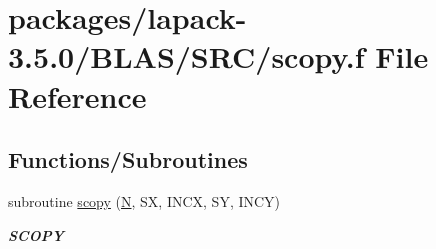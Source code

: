 \hypertarget{lapack-3_85_80_2BLAS_2SRC_2scopy_8f}{}\section{packages/lapack-\/3.5.0/\+B\+L\+A\+S/\+S\+R\+C/scopy.f File Reference}
\label{lapack-3_85_80_2BLAS_2SRC_2scopy_8f}
\subsection*{Functions/\+Subroutines}
\begin{DoxyCompactItemize}
\item 
subroutine \hyperlink{group__single__blas__level1_ga24785e467bd921df5a2b7300da57c469}{scopy} (\hyperlink{polmisc_8c_a0240ac851181b84ac374872dc5434ee4}{N}, S\+X, I\+N\+C\+X, S\+Y, I\+N\+C\+Y)
\begin{DoxyCompactList}\small\item\em {\bfseries S\+C\+O\+P\+Y} \end{DoxyCompactList}\end{DoxyCompactItemize}
